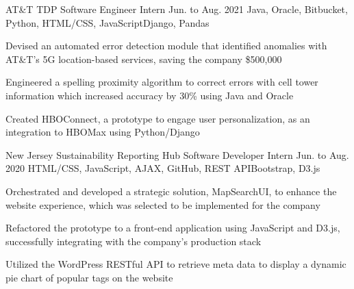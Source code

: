 
\begin{cventry}
    {AT\&T}
    {TDP Software Engineer Intern}
    {Jun. to Aug. 2021}
    {Java, Oracle, Bitbucket, Python, HTML/CSS, JavaScript}{Django, Pandas}
    \begin{cvitems}
        \item Devised an automated error detection module that identified anomalies with AT\&T's 5G location-based services, saving the company \$500,000
        \item Engineered a spelling proximity algorithm to correct errors with cell tower information which increased accuracy by 30\% using Java and Oracle
        \item Created HBOConnect, a prototype to engage user personalization, as an integration to HBOMax using Python/Django
    \end{cvitems}
\end{cventry}




\begin{cventry}
    {New Jersey Sustainability Reporting Hub}
    {Software Developer Intern}
    {Jun. to Aug. 2020}
    {HTML/CSS, JavaScript, AJAX, GitHub, REST API}{Bootstrap, D3.js}
    \begin{cvitems}
        \item Orchestrated and developed a strategic solution, MapSearchUI, to enhance the website experience, which was selected to be implemented for the company
        \item Refactored the prototype to a front-end application using JavaScript and D3.js, successfully integrating with the company's production stack
        \item Utilized the WordPress RESTful API to retrieve meta data  to display a dynamic pie chart of popular tags on the website
    \end{cvitems}
\end{cventry}


